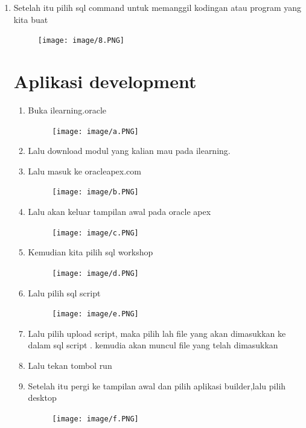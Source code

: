 \documentclass{article}
\begin{document}
\begin{enumerate}
\begin{enumerate}
\begin{figure}[h]
            \end{figure}
    \newpage \item Setelah itu pilih sql command untuk memanggil kodingan atau program yang kita buat
    \begin{figure}[h]
            \centerline{\texttt{[image: image/8.PNG]}}
            \end{figure}
\newpage \section{Aplikasi development}
\begin{enumerate}
    \item Buka ilearning.oracle
    \begin{figure}[h]
            \centerline{\texttt{[image: image/a.PNG]}}
            \end{figure}
    \item Lalu download modul yang kalian mau pada ilearning.
    \item Lalu masuk ke oracleapex.com
    \begin{figure}[h]
            \centerline{\texttt{[image: image/b.PNG]}}
            \end{figure}
    \newpage \item Lalu akan keluar tampilan awal pada oracle apex
    \begin{figure}[h]
            \centerline{\texttt{[image: image/c.PNG]}}
            \end{figure}
    \newpage \item Kemudian kita pilih sql workshop
    \begin{figure}[h]
            \centerline{\texttt{[image: image/d.PNG]}}
            \end{figure}
    \newpage \item Lalu pilih sql script
    \begin{figure}[h]
            \centerline{\texttt{[image: image/e.PNG]}}
            \end{figure}
    \item Lalu pilih upload script, maka pilih lah file yang akan dimasukkan ke dalam sql script . kemudia akan muncul file yang telah dimasukkan
    \item Lalu tekan tombol run
    \item Setelah itu pergi ke tampilan awal dan pilih aplikasi builder,lalu pilih desktop
    \begin{figure}[h]
            \centerline{\texttt{[image: image/f.PNG]}}
            \end{figure}

\end{enumerate}
\end{enumerate}
\end{enumerate}
\end{document}
